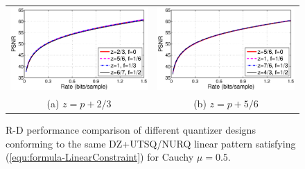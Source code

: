 \documentclass[smallabstract,smallcaptions]{dccpaper}
\begin{document}
\begin{figure}[tp]
\begin{center}
\begin{tabular}{cc}
\includegraphics[width = 0.5\linewidth]{Figures/section4/RD_Cauchy_mu=0_5_z=p+0_67} &
\includegraphics[width = 0.5\linewidth]{Figures/section4/RD_Cauchy_mu=0_5_z=p+0_83} \\
{\small (a) $z=p+2/3$} & {\small (b) $z=p+5/6$} 
\end{tabular}
\end{center}
\vspace{-20pt}
\caption{\label{fig:RD_same_pattern}
R-D performance comparison of different quantizer designs conforming to the same DZ+UTSQ/NURQ linear pattern satisfying (\ref{equ:formula-LinearConstraint}) for Cauchy $\mu=0.5$.}
\end{figure} 
\end{document}
